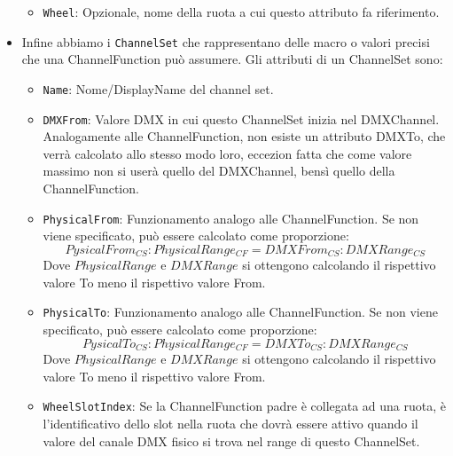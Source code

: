 \documentclass[main.tex]{subfiles}
\begin{document}
\begin{itemize}
\begin{itemize}
            \item \lstinline{Wheel}: Opzionale, nome della ruota a cui questo attributo fa riferimento.
        \end{itemize}
    \item Infine abbiamo i \lstinline{ChannelSet} che rappresentano delle macro o valori precisi che una ChannelFunction può assumere. Gli attributi di un ChannelSet sono: \begin{itemize}
            \item \lstinline{Name}: Nome/DisplayName del channel set.
            \item \lstinline{DMXFrom}: Valore DMX in cui questo ChannelSet inizia nel DMXChannel. Analogamente alle ChannelFunction, non esiste un attributo DMXTo, che verrà calcolato allo stesso modo loro, eccezion fatta che come valore massimo non si userà quello del DMXChannel, bensì quello della ChannelFunction. 
            \item \lstinline{PhysicalFrom}: Funzionamento analogo alle ChannelFunction. Se non viene specificato, può essere calcolato come proporzione:
            \[PysicalFrom_{CS} : PhysicalRange_{CF} = DMXFrom_{CS} : DMXRange_{CS}\]
            Dove $PhysicalRange$ e $DMXRange$ si ottengono calcolando il rispettivo valore To meno il rispettivo valore From.
            \item \lstinline{PhysicalTo}: Funzionamento analogo alle ChannelFunction. Se non viene specificato, può essere calcolato come proporzione:
            \[PysicalTo_{CS} : PhysicalRange_{CF} = DMXTo_{CS} : DMXRange_{CS}\]
            Dove $PhysicalRange$ e $DMXRange$ si ottengono calcolando il rispettivo valore To meno il rispettivo valore From.
            \item \lstinline{WheelSlotIndex}: Se la ChannelFunction padre è collegata ad una ruota, è l'identificativo dello slot nella ruota che dovrà essere attivo quando il valore del canale DMX fisico si trova nel range di questo ChannelSet.
        \end{itemize}
\end{itemize}

\end{document}
